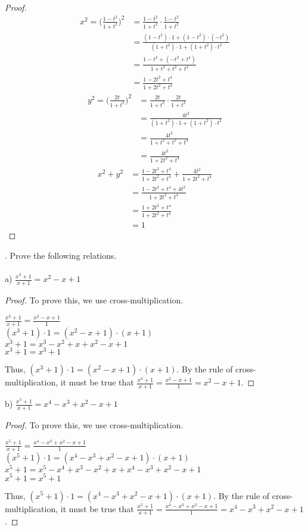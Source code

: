 \documentclass[12pt]{article}
\begin{document}
\begin{proof}
~
\begin{align*}
x^2=\bigg(\displaystyle \frac{1-t^2}{1+t^2}\bigg)^2&=\displaystyle \frac{1-t^2}{1+t^2}\cdot \displaystyle \frac{1-t^2}{1+t^2} \\
&=\displaystyle \frac{(1-t^2)\cdot1+(1-t^2)\cdot(-t^2)}{(1+t^2)\cdot1+(1+t^2)\cdot t^2} \\
&=\displaystyle \frac{1-t^2+(-t^2+t^4)}{1+t^2+t^2+t^4} \\
&=\displaystyle \frac{1-2t^2+t^4}{1+2t^2+t^4}
\end{align*}
\begin{align*}
y^2=\bigg(\displaystyle \frac{2t}{1+t^2}\bigg)^2&=\displaystyle \frac{2t}{1+t^2}\cdot \displaystyle \frac{2t}{1+t^2} \\
&=\displaystyle \frac{4t^2}{(1+t^2)\cdot1+(1+t^2)\cdot t^2} \\
&=\displaystyle \frac{4t^2}{1+t^2+t^2+t^4} \\
&=\displaystyle \frac{4t^2}{1+2t^2+t^4}
\end{align*}
\begin{align*}
x^2+y^2&=\displaystyle \frac{1-2t^2+t^4}{1+2t^2+t^4}+\displaystyle \frac{4t^2}{1+2t^2+t^4} \\
&=\displaystyle \frac{1-2t^2+t^4+4t^2}{1+2t^2+t^4} \\
&=\displaystyle \frac{1+2t^2+t^4}{1+2t^2+t^4} \\
&=1
\end{align*}
\end{proof}
. Prove the following relations. \\
\\
a) $\displaystyle \frac{x^3+1}{x+1}=x^2-x+1$
\begin{proof}
To prove this, we use cross-multiplication.
\begin{center}
$\displaystyle \frac{x^3+1}{x+1}=\displaystyle \frac{x^2-x+1}{1}$ \\
$(x^3+1)\cdot1=(x^2-x+1)\cdot(x+1)$ \\
$x^3+1=x^3-x^2+x+x^2-x+1$ \\
$x^3+1=x^3+1$
\end{center}
Thus, $(x^3+1)\cdot1=(x^2-x+1)\cdot(x+1)$. By the rule of cross-multiplication, it must be true that $\displaystyle \frac{x^3+1}{x+1}=\displaystyle \frac{x^2-x+1}{1}=x^2-x+1$.
\end{proof}
\noindent b) $\displaystyle \frac{x^5+1}{x+1}=x^4-x^3+x^2-x+1$
\begin{proof}
To prove this, we use cross-multiplication.
\begin{center}
$\displaystyle \frac{x^5+1}{x+1}=\displaystyle \frac{x^4-x^3+x^2-x+1}{1}$ \\
$(x^5+1)\cdot1=(x^4-x^3+x^2-x+1)\cdot(x+1)$ \\
$x^5+1=x^5-x^4+x^3-x^2+x+x^4-x^3+x^2-x+1$ \\
$x^5+1=x^5+1$
\end{center}
Thus, $(x^5+1)\cdot1=(x^4-x^3+x^2-x+1)\cdot(x+1)$. By the rule of cross-multiplication, it must be true that $\displaystyle \frac{x^5+1}{x+1}=\displaystyle \frac{x^4-x^3+x^2-x+1}{1}=x^4-x^3+x^2-x+1$.
\end{proof}
\end{document}
